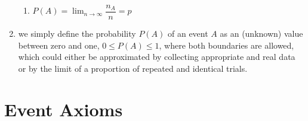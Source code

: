 \begin{enumerate}
\begin{enumerate}
        \item $P(A) =\displaystyle \lim_{n\to \infty} \dfrac{n_A}{n} = p$
        \hfill \cite{statistics/book/Statistics-for-Data-Scientists/Maurits-Kaptein}
    \end{enumerate}
    
    \item we simply define the probability $P(A)$ of an event $A$ as an (unknown) value between zero and one, $0 \leq P (A) \leq 1$, where both boundaries are allowed, which could either be approximated by collecting appropriate and real data or by the limit of a proportion of repeated and identical trials.
    \hfill \cite{statistics/book/Statistics-for-Data-Scientists/Maurits-Kaptein}
\end{enumerate}


\section{Event Axioms}


